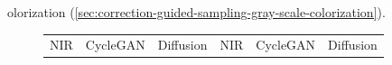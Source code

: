 olorization (\autoref{sec:correction-guided-sampling-gray-scale-colorization}).

\begin{figure}[htp!]
    \centering
    \begin{tabularx}{\textwidth}{Y Y Y !{\space} Y Y Y}
        NIR                                                                                & CycleGAN                                                                                     & Diffusion                                                                                & NIR                                                                                & CycleGAN                                                                                     & Diffusion                                                                                \\

\end{tabularx}
\end{figure}
